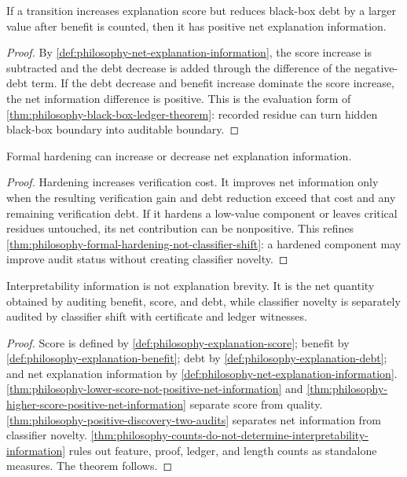 \begin{theorem}
\label{thm:philosophy-debt-reduction-justifies-higher-complexity}
If a transition increases explanation score but reduces black-box debt by
a larger value after benefit is counted, then it has positive net
explanation information.
\end{theorem}
\begin{proof}
By \autoref{def:philosophy-net-explanation-information}, the score
increase is subtracted and the debt decrease is added through the
difference of the negative-debt term. If the debt decrease and benefit
increase dominate the score increase, the net information difference is
positive. This is the evaluation form of
\autoref{thm:philosophy-black-box-ledger-theorem}: recorded residue can
turn hidden black-box boundary into auditable boundary.
\end{proof}

\begin{theorem}
\label{thm:philosophy-formal-hardening-net-gain}
Formal hardening can increase or decrease net explanation information.
\end{theorem}
\begin{proof}
Hardening increases verification cost. It improves net information only
when the resulting verification gain and debt reduction exceed that cost
and any remaining verification debt. If it hardens a low-value component
or leaves critical residues untouched, its net contribution can be
nonpositive. This refines
\autoref{thm:philosophy-formal-hardening-not-classifier-shift}: a
hardened component may improve audit status without creating classifier
novelty.
\end{proof}

\begin{theorem}
\label{thm:philosophy-explanation-complexity-information-theorem}
Interpretability information is not explanation brevity. It is the net
quantity obtained by auditing benefit, score, and debt, while classifier
novelty is separately audited by classifier shift with certificate and
ledger witnesses.
\end{theorem}
\begin{proof}
Score is defined by
\autoref{def:philosophy-explanation-score}; benefit by
\autoref{def:philosophy-explanation-benefit}; debt by
\autoref{def:philosophy-explanation-debt}; and net explanation
information by \autoref{def:philosophy-net-explanation-information}.
\autoref{thm:philosophy-lower-score-not-positive-net-information} and
\autoref{thm:philosophy-higher-score-positive-net-information} separate
score from quality. \autoref{thm:philosophy-positive-discovery-two-audits}
separates net information from classifier novelty.
\autoref{thm:philosophy-counts-do-not-determine-interpretability-information}
rules out feature, proof, ledger, and length counts as standalone
measures. The theorem follows.
\end{proof}
